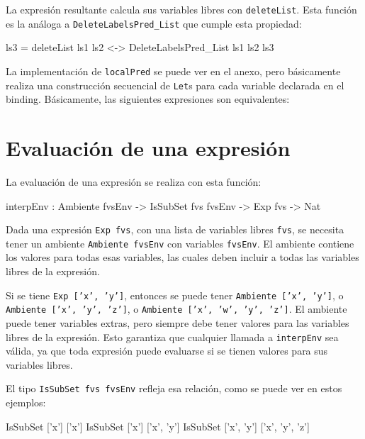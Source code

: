 La expresión resultante calcula sus variables libres con \texttt{deleteList}. Esta función es la análoga a \texttt{DeleteLabelsPred\_List} que cumple esta propiedad:

\begin{code}
ls3 = deleteList ls1 ls2 <-> DeleteLabelsPred_List ls1 ls2 ls3
\end{code}

La implementación de \texttt{localPred} se puede ver en el anexo, pero básicamente realiza una construcción secuencial de \texttt{Let}s para cada variable declarada en el binding. Básicamente, las siguientes expresiones son equivalentes:


\section{Evaluación de una expresión}

La evaluación de una expresión se realiza con esta función:

\begin{code}
interpEnv : Ambiente fvsEnv -> IsSubSet fvs fvsEnv -> Exp fvs -> Nat
\end{code}

Dada una expresión \texttt{Exp fvs}, con una lista de variables libres \texttt{fvs}, se necesita tener un ambiente \texttt{Ambiente fvsEnv} con variables \texttt{fvsEnv}. El ambiente contiene los valores para todas esas variables, las cuales deben incluir a todas las variables libres de la expresión.

Si se tiene \texttt{Exp ['x', 'y']}, entonces se puede tener \texttt{Ambiente ['x', 'y']}, o \texttt{Ambiente ['x', 'y', 'z']}, o \texttt{Ambiente ['x', 'w', 'y', 'z']}. El ambiente puede tener variables extras, pero siempre debe tener valores para las variables libres de la expresión. Esto garantiza que cualquier llamada a \texttt{interpEnv} sea válida, ya que toda expresión puede evaluarse si se tienen valores para sus variables libres.

El tipo \texttt{IsSubSet fvs fvsEnv} refleja esa relación, como se puede ver en estos ejemplos:

\begin{code}
IsSubSet ['x'] ['x']
IsSubSet ['x'] ['x', 'y']
IsSubSet ['x', 'y'] ['x', 'y', 'z']
\end{code}

